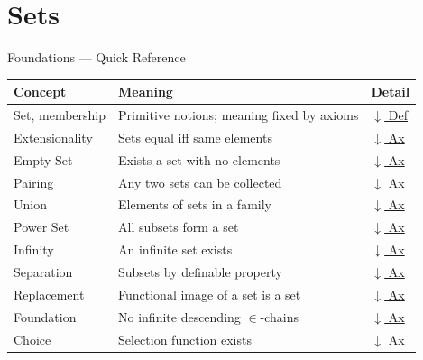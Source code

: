 \section{Sets}




\begin{toolkitbox}{Foundations --- Quick Reference}
\small
\begin{tabular}{l l l}
\toprule
\textbf{Concept} & \textbf{Meaning} & \textbf{Detail} \\
\midrule
Set, membership        & Primitive notions; meaning fixed by axioms & \hyperref[def:set-membership]{$\downarrow$ Def} \\
Extensionality         & Sets equal iff same elements & \hyperref[ax:extensionality]{$\downarrow$ Ax} \\
Empty Set              & Exists a set with no elements & \hyperref[ax:empty-set]{$\downarrow$ Ax} \\
Pairing                & Any two sets can be collected & \hyperref[ax:pairing]{$\downarrow$ Ax} \\
Union                  & Elements of sets in a family & \hyperref[ax:union]{$\downarrow$ Ax} \\
Power Set              & All subsets form a set & \hyperref[ax:power-set]{$\downarrow$ Ax} \\
Infinity               & An infinite set exists & \hyperref[ax:infinity]{$\downarrow$ Ax} \\
Separation             & Subsets by definable property & \hyperref[ax:separation]{$\downarrow$ Ax} \\
Replacement            & Functional image of a set is a set & \hyperref[ax:replacement]{$\downarrow$ Ax} \\
Foundation             & No infinite descending $\in$-chains & \hyperref[ax:foundation]{$\downarrow$ Ax} \\
Choice                 & Selection function exists & \hyperref[ax:choice]{$\downarrow$ Ax} \\
\bottomrule
\end{tabular}
\end{toolkitbox}

